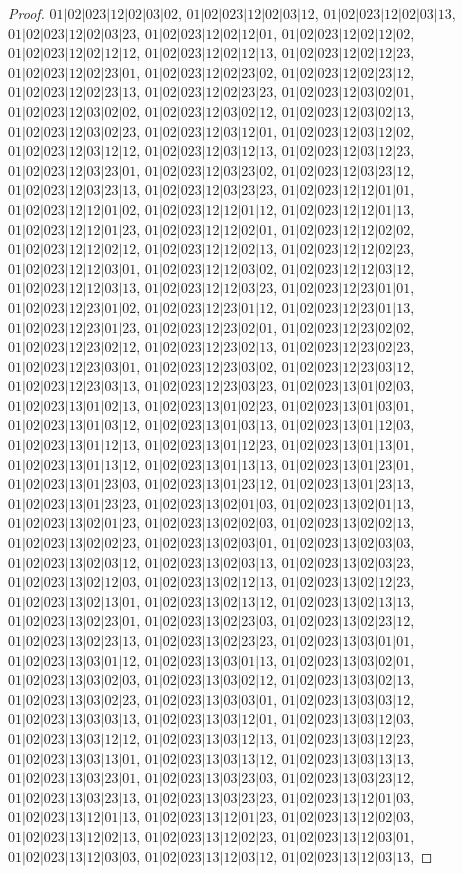 \documentclass[12pt]{article}
\theoremstyle{plain}
\theoremstyle{definition}
\theoremstyle{remark}
\begin{document}
\begin{proof}
$01|02|023|12|02|03|02$, $01|02|023|12|02|03|12$, $01|02|023|12|02|03|13$, $01|02|023|12|02|03|23$, $01|02|023|12|02|12|01$, $01|02|023|12|02|12|02$, $01|02|023|12|02|12|12$, $01|02|023|12|02|12|13$, $01|02|023|12|02|12|23$, $01|02|023|12|02|23|01$, $01|02|023|12|02|23|02$, $01|02|023|12|02|23|12$, $01|02|023|12|02|23|13$, $01|02|023|12|02|23|23$, $01|02|023|12|03|02|01$, $01|02|023|12|03|02|02$, $01|02|023|12|03|02|12$, $01|02|023|12|03|02|13$, $01|02|023|12|03|02|23$, $01|02|023|12|03|12|01$, $01|02|023|12|03|12|02$, $01|02|023|12|03|12|12$, $01|02|023|12|03|12|13$, $01|02|023|12|03|12|23$, $01|02|023|12|03|23|01$, $01|02|023|12|03|23|02$, $01|02|023|12|03|23|12$, $01|02|023|12|03|23|13$, $01|02|023|12|03|23|23$, $01|02|023|12|12|01|01$, $01|02|023|12|12|01|02$, $01|02|023|12|12|01|12$, $01|02|023|12|12|01|13$, $01|02|023|12|12|01|23$, $01|02|023|12|12|02|01$, $01|02|023|12|12|02|02$, $01|02|023|12|12|02|12$, $01|02|023|12|12|02|13$, $01|02|023|12|12|02|23$, $01|02|023|12|12|03|01$, $01|02|023|12|12|03|02$, $01|02|023|12|12|03|12$, $01|02|023|12|12|03|13$, $01|02|023|12|12|03|23$, $01|02|023|12|23|01|01$, $01|02|023|12|23|01|02$, $01|02|023|12|23|01|12$, $01|02|023|12|23|01|13$, $01|02|023|12|23|01|23$, $01|02|023|12|23|02|01$, $01|02|023|12|23|02|02$, $01|02|023|12|23|02|12$, $01|02|023|12|23|02|13$, $01|02|023|12|23|02|23$, $01|02|023|12|23|03|01$, $01|02|023|12|23|03|02$, $01|02|023|12|23|03|12$, $01|02|023|12|23|03|13$, $01|02|023|12|23|03|23$, $01|02|023|13|01|02|03$, $01|02|023|13|01|02|13$, $01|02|023|13|01|02|23$, $01|02|023|13|01|03|01$, $01|02|023|13|01|03|12$, $01|02|023|13|01|03|13$, $01|02|023|13|01|12|03$, $01|02|023|13|01|12|13$, $01|02|023|13|01|12|23$, $01|02|023|13|01|13|01$, $01|02|023|13|01|13|12$, $01|02|023|13|01|13|13$, $01|02|023|13|01|23|01$, $01|02|023|13|01|23|03$, $01|02|023|13|01|23|12$, $01|02|023|13|01|23|13$, $01|02|023|13|01|23|23$, $01|02|023|13|02|01|03$, $01|02|023|13|02|01|13$, $01|02|023|13|02|01|23$, $01|02|023|13|02|02|03$, $01|02|023|13|02|02|13$, $01|02|023|13|02|02|23$, $01|02|023|13|02|03|01$, $01|02|023|13|02|03|03$, $01|02|023|13|02|03|12$, $01|02|023|13|02|03|13$, $01|02|023|13|02|03|23$, $01|02|023|13|02|12|03$, $01|02|023|13|02|12|13$, $01|02|023|13|02|12|23$, $01|02|023|13|02|13|01$, $01|02|023|13|02|13|12$, $01|02|023|13|02|13|13$, $01|02|023|13|02|23|01$, $01|02|023|13|02|23|03$, $01|02|023|13|02|23|12$, $01|02|023|13|02|23|13$, $01|02|023|13|02|23|23$, $01|02|023|13|03|01|01$, $01|02|023|13|03|01|12$, $01|02|023|13|03|01|13$, $01|02|023|13|03|02|01$, $01|02|023|13|03|02|03$, $01|02|023|13|03|02|12$, $01|02|023|13|03|02|13$, $01|02|023|13|03|02|23$, $01|02|023|13|03|03|01$, $01|02|023|13|03|03|12$, $01|02|023|13|03|03|13$, $01|02|023|13|03|12|01$, $01|02|023|13|03|12|03$, $01|02|023|13|03|12|12$, $01|02|023|13|03|12|13$, $01|02|023|13|03|12|23$, $01|02|023|13|03|13|01$, $01|02|023|13|03|13|12$, $01|02|023|13|03|13|13$, $01|02|023|13|03|23|01$, $01|02|023|13|03|23|03$, $01|02|023|13|03|23|12$, $01|02|023|13|03|23|13$, $01|02|023|13|03|23|23$, $01|02|023|13|12|01|03$, $01|02|023|13|12|01|13$, $01|02|023|13|12|01|23$, $01|02|023|13|12|02|03$, $01|02|023|13|12|02|13$, $01|02|023|13|12|02|23$, $01|02|023|13|12|03|01$, $01|02|023|13|12|03|03$, $01|02|023|13|12|03|12$, $01|02|023|13|12|03|13$, 
\end{proof}
\end{document}
